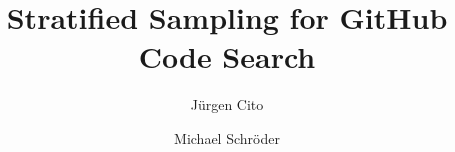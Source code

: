 \documentclass[sigconf,review]{acmart}
\begin{document}
\title{Stratified Sampling for GitHub Code Search}

\author{Jürgen Cito}

\author{Michael Schröder}

\begin{abstract}

\end{abstract}

\maketitle


%
\end{document}
